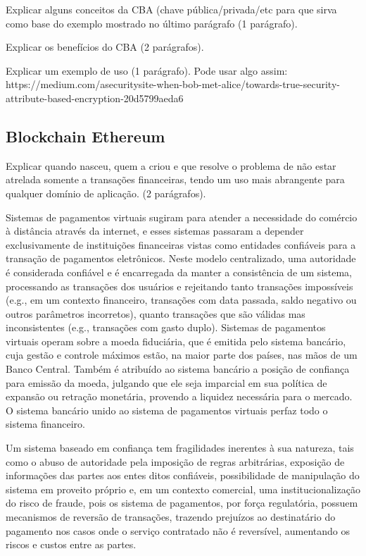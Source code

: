 \documentclass[a4paper,11pt]{article}
\begin{document}
{\color{ForestGreen}Explicar alguns conceitos da CBA (chave pública/privada/etc para que sirva como base do exemplo mostrado no último parágrafo (1 parágrafo).} 

{\color{ForestGreen}Explicar os benefícios do CBA (2 parágrafos).} 

{\color{ForestGreen}Explicar um exemplo de uso (1 parágrafo). Pode usar algo assim: https://medium.com/asecuritysite-when-bob-met-alice/towards-true-security-attribute-based-encryption-20d5799aeda6} 

\subsection{Blockchain Ethereum}

{\color{ForestGreen}Explicar quando nasceu, quem a criou e que resolve o problema de não estar atrelada somente a transações financeiras, tendo um uso mais abrangente para qualquer domínio de aplicação. (2 parágrafos).} 

 Sistemas de pagamentos virtuais sugiram para atender a necessidade do comércio à distância através da internet, e esses sistemas passaram a depender exclusivamente de instituições financeiras vistas como entidades confiáveis para a transação de pagamentos eletrônicos.
 Neste modelo centralizado, uma autoridade é considerada confiável e é encarregada da manter a consistência de um sistema, processando as transações dos usuários e rejeitando tanto transações impossíveis (e.g., em um contexto financeiro, transações com data passada, saldo negativo ou outros parâmetros incorretos), quanto transações que são válidas mas inconsistentes (e.g., transações com gasto duplo).
 Sistemas de pagamentos virtuais operam sobre a moeda fiduciária, que é emitida pelo sistema bancário, cuja gestão e controle máximos estão, na maior parte dos países, nas mãos de um Banco Central. Também é atribuído ao sistema bancário a posição de confiança para emissão da moeda, julgando que ele seja imparcial em sua política de expansão ou retração monetária, provendo a liquidez necessária para o mercado. O sistema bancário unido ao sistema de pagamentos virtuais perfaz todo o sistema financeiro.

Um sistema baseado em confiança tem fragilidades inerentes à sua natureza, tais como o abuso de autoridade pela imposição de regras arbitrárias, exposição de informações das partes aos entes ditos confiáveis, possibilidade de manipulação do sistema em proveito próprio e, em um contexto comercial, uma institucionalização do risco de fraude, pois os sistema de pagamentos, por força regulatória, possuem mecanismos de reversão de transações, trazendo prejuízos ao destinatário do pagamento nos casos onde o serviço contratado não é reversível, aumentando os riscos e custos entre as partes.
\end{document}
